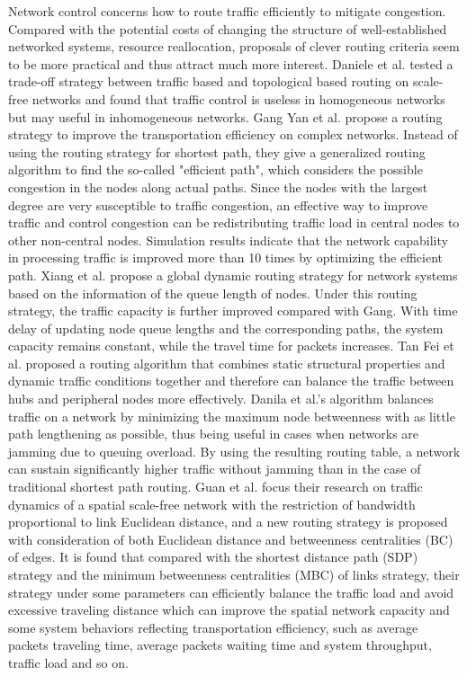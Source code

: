 \documentclass[onecolumn,preprintnumbers,amsmath,amssymb]{revtex4}
\begin{document}
Network control concerns how to route traffic efficiently to mitigate congestion.
Compared with the potential costs of changing the structure of well-established networked systems, resource reallocation, proposals of clever routing criteria seem to be more practical and thus attract much more interest.
Daniele et al. tested a trade-off strategy between traffic based and topological based routing on scale-free networks and found that traffic control is useless in homogeneous networks but may useful in inhomogeneous networks\cite{DDL}. 
Gang Yan et al. propose a routing strategy to improve the transportation efficiency on complex networks. Instead of using the routing strategy for shortest path, they give a generalized routing algorithm to find the so-called "efficient path", which considers the possible congestion in the nodes along actual paths. Since the nodes with the largest degree are very susceptible to traffic congestion, an effective way to improve traffic and control congestion can be redistributing traffic load in central nodes to other non-central nodes. Simulation results indicate that the network capability in processing traffic is improved more than 10 times by optimizing the efficient path\cite{GYT}.
Xiang et al. propose a global dynamic routing strategy for network systems based on the information of the queue length of nodes. Under this routing strategy, the traffic capacity is further improved compared with Gang\cite{GYT}. With time delay of updating node queue lengths and the corresponding paths, the system capacity remains constant, while the travel time for packets increases\cite{XLM}.
Tan Fei et al. proposed a routing algorithm that combines static structural properties and dynamic traffic conditions together and therefore can balance the traffic between hubs and peripheral nodes more effectively\cite{FTY}.
Danila et al.'s algorithm balances traffic on a network by minimizing the maximum node betweenness with as little path lengthening as possible, thus being useful in cases when networks are jamming due to queuing overload. By using the resulting routing table, a network can sustain significantly higher traffic without jamming than in the case of traditional shortest path routing\cite{BDY}.
Guan et al. focus their research on traffic dynamics of a spatial scale-free network with the restriction of bandwidth proportional to link Euclidean distance, and a new routing strategy is proposed with consideration of both Euclidean distance and betweenness centralities (BC) of edges. It is found that compared with the shortest distance path (SDP) strategy and the minimum betweenness centralities (MBC) of links strategy, their strategy under some parameters can efficiently balance the traffic load and avoid excessive traveling distance which can improve the spatial network capacity and some system behaviors reflecting transportation efficiency, such as average packets traveling time, average packets waiting time and system throughput, traffic load and so on\cite{XLMD}.
\end{document}
